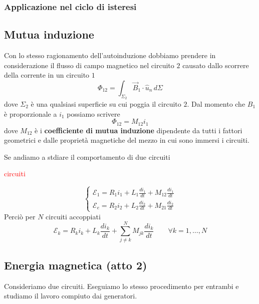 \documentclass[x11names]{report}
\begin{document}
\subsubsection{Applicazione nel ciclo di isteresi}

\subsection{Mutua induzione}
Con lo stesso ragionamento dell'autoinduzione dobbiamo prendere in considerazione il flusso di campo magnetico nel circuito \(2\) causato dallo scorrere della corrente in un circuito \(1\)
\[
\Phi_{12} = \int_{\Sigma_2}\vec{B}_1 \cdot \hat{u}_{n} \, d\Sigma
\]
dove \(\Sigma_2\) è una qualsiasi superficie su cui poggia il circuito \(2\). Dal momento che \(B_1\) è proporzionale a \(i_1\) possiamo scrivere 
\[
\Phi_{12} = M_{12}i_1
\]
dove \(M_{12}\) è i \textbf{coefficiente di mutua induzione} dipendente da tutti i fattori geometrici e dalle proprietà magnetiche del mezzo in cui sono immersi i circuiti. 

Se andiamo a stdiare il comportamento di due circuiti 
\begin{center}
	\textcolor{red}{circuiti}
\end{center}
\[
\begin{cases}
	\mathcal{E}_1 = R_1i_1 + L_1\frac{di_1}{dt} + M_{12}\frac{di_1}{dt} \\
	\mathcal{E}_e = R_2i_2 + L_2\frac{di_2}{dt} + M_{21}\frac{di_2}{dt}
\end{cases}
\]
Perciò per \(N\) circuiti accoppiati
\begin{equation}
	\mathcal{E}_k = R_ki_k + L_k\frac{di_k}{dt} + \sum_{j\neq k}^{N}M_{jk}\frac{di_k}{dt} \qquad \forall k = 1,\dots,N
\end{equation}
\subsection{Energia magnetica (atto 2)} 
Consideriamo due circuiti. Eseguiamo lo stesso procedimento per entrambi e studiamo il lavoro compiuto dai generatori. 
\end{document}
